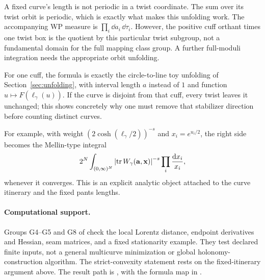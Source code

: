 A fixed curve's length is not periodic in a twist coordinate. The sum over
its twist orbit is periodic, which is exactly what makes this unfolding
work. The accompanying WP measure is $\prod_i\dd a_i\,\dd\tau_i$.
However, the positive cuff orthant times one twist box is the quotient by
this particular twist subgroup, not a fundamental domain for the full
mapping class group. A further full-moduli integration needs the appropriate
orbit unfolding.

For one cuff, the formula is exactly the circle-to-line toy
unfolding of Section~\ref{sec:unfolding}, with interval length
$a$ instead of $1$ and function $u\mapsto F(\ell_\gamma(u))$.
If the curve is disjoint from that cuff, every twist leaves it
unchanged; this shows concretely why one must remove that
stabilizer direction before counting distinct curves.

For example, with weight $(2\cosh(\ell_\gamma/2))^{-s}$ and
$x_i=e^{u_i/2}$, the right side becomes the Mellin-type integral
\begin{equation}
 2^N\int_{(0,\infty)^N}
 \left|\operatorname{tr} W_\gamma(\mathbf a,\mathbf x)\right|^{-s}
             \prod_i\frac{\mathop{}\!\mathrm d x_i}{x_i},
 \label{eq:mellin}
\end{equation}
whenever it converges. This is an explicit analytic object attached to the
curve itinerary and the fixed pants lengths.

\paragraph{Computational support.}
Groups G4--G5 and G8 of
 check the local Lorentz
distance, endpoint derivatives and Hessian, seam matrices, and a fixed
stationarity example. They test declared finite inputs, not a general
multicurve minimization or global holonomy-construction algorithm.
The strict-convexity statement rests on the fixed-itinerary argument
above. The result path is ,
with the formula map in .

